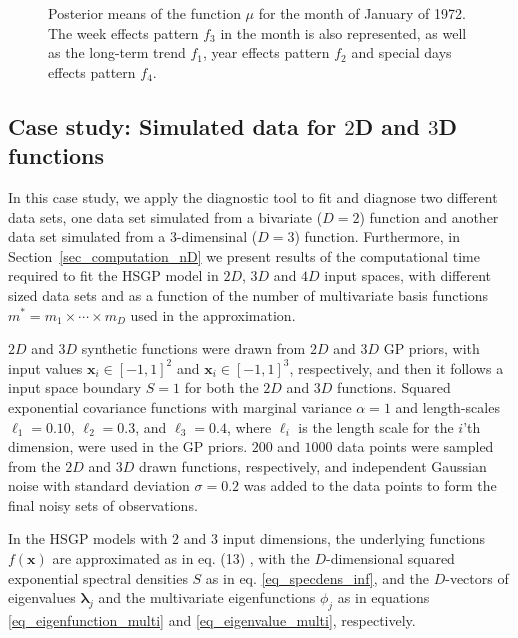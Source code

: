 \begin{figure}%
\centering
{}
\caption{Posterior means of the function $\mu$ for the month of January of 1972. The week effects pattern $f_3$ in the month is also represented, as well as the long-term trend $f_1$, year effects pattern $f_2$ and special days effects pattern $f_4$. }
  \label{fig12_posteriors_onemonth_birthday}
\end{figure}

\subsection{Case study: Simulated data for $2$D and $3$D functions}\label{sec_caseIII}

In this case study, we apply the diagnostic tool to fit and diagnose two different data sets, one data set simulated from a bivariate ($D=2$) function and another data set simulated from a $3$-dimensinal ($D=3$) function. Furthermore, in Section~\ref{sec_computation_nD} we present results of the computational time required to fit the HSGP model in $2D$, $3D$ and $4D$ input spaces, with different sized data sets and as a function of the number of multivariate basis functions $m^*=m_1\times \cdots \times m_D$ used in the approximation.

$2D$ and $3D$ synthetic functions were drawn from $2D$ and $3D$ GP priors, with input values $\bm{x}_i \in [-1,1]^2$ and $\bm{x}_i \in [-1,1]^3$, respectively, {\color{blue}and then it follows a input space boundary $S=1$ for both the $2D$ and $3D$ functions}. Squared exponential covariance functions with marginal variance $\alpha=1$ and length-scales $\ell_1=0.10$, $\ell_2=0.3$, and $\ell_3=0.4$, where $\ell_i$ is the length scale for the $i$'th dimension, were used in the GP priors. $200$ and $1000$ data points were sampled from the $2D$ and $3D$ drawn functions, respectively, and independent Gaussian noise with standard deviation $\sigma=0.2$ was added to the data points to form the final noisy sets of observations.

In the HSGP models with $2$ and $3$ input dimensions, the underlying functions $f(\bm{x})$ are approximated as in eq. (13)%
, with the $D$-dimensional squared exponential spectral densities $S$ as in eq. \eqref{eq_specdens_inf}, and the $D$-vectors of eigenvalues $\bm{\lambda}_j$ and the multivariate eigenfunctions $\phi_j$ as in equations \eqref{eq_eigenfunction_multi} and \eqref{eq_eigenvalue_multi}, respectively.

